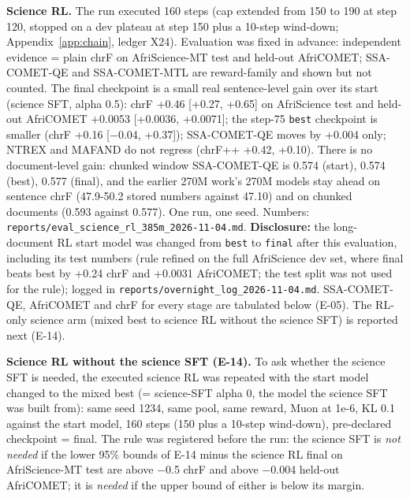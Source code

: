 \textbf{Science RL.} The run executed 160 steps (cap extended from 150 to 190 at step 120, stopped on a dev plateau at step 150 plus a 10-step wind-down; Appendix~\ref{app:chain}, ledger X24). Evaluation was fixed in advance: independent evidence = plain chrF on AfriScience-MT test and held-out AfriCOMET; SSA-COMET-QE and SSA-COMET-MTL are reward-family and shown but not counted. The final checkpoint is a small real sentence-level gain over its start (science SFT, alpha 0.5): chrF +0.46 [+0.27, +0.65] on AfriScience test and held-out AfriCOMET +0.0053 [+0.0036, +0.0071]; the step-75 \texttt{best} checkpoint is smaller (chrF +0.16 [\ensuremath{-}0.04, +0.37]); SSA-COMET-QE moves by +0.004 only; NTREX and MAFAND do not regress (chrF++ +0.42, +0.10). There is no document-level gain: chunked window SSA-COMET-QE is 0.574 (start), 0.574 (best), 0.577 (final), and the earlier 270M work's 270M models stay ahead on sentence chrF (47.9-50.2 stored numbers against 47.10) and on chunked documents (0.593 against 0.577). One run, one seed. Numbers: \texttt{reports/\allowbreak{}eval\_\allowbreak{}science\_\allowbreak{}rl\_\allowbreak{}385m\_\allowbreak{}2026-\allowbreak{}11-\allowbreak{}04.\allowbreak{}md}. \textbf{Disclosure:} the long-document RL start model was changed from \texttt{best} to \texttt{final} after this evaluation, including its test numbers (rule refined on the full AfriScience dev set, where final beats best by +0.24 chrF and +0.0031 AfriCOMET; the test split was not used for the rule); logged in \texttt{reports/\allowbreak{}overnight\_\allowbreak{}log\_\allowbreak{}2026-\allowbreak{}11-\allowbreak{}04.\allowbreak{}md}. SSA-COMET-QE, AfriCOMET and chrF for every stage are tabulated below (E-05). The RL-only science arm (mixed best to science RL without the science SFT) is reported next (E-14).

\textbf{Science RL without the science SFT (E-14).} To ask whether the science SFT is needed, the executed science RL was repeated with the start model changed to the mixed best (= science-SFT alpha 0, the model the science SFT was built from): same seed 1234, same pool, same reward, Muon at 1e-6, KL 0.1 against the start model, 160 steps (150 plus a 10-step wind-down), pre-declared checkpoint = final. The rule was registered before the run: the science SFT is \emph{not needed} if the lower 95\% bounds of E-14 minus the science RL final on AfriScience-MT test are above \ensuremath{-}0.5 chrF and above \ensuremath{-}0.004 held-out AfriCOMET; it is \emph{needed} if the upper bound of either is below its margin. 

